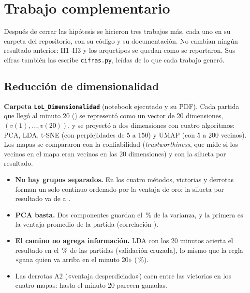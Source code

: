 \documentclass[11pt,letterpaper]{article}
\begin{document}
\section{Trabajo complementario}
\label{sec:complementario}

Después de cerrar las hipótesis se hicieron tres trabajos más, cada uno en su carpeta del
repositorio, con su código y su documentación. No cambian ningún resultado anterior: H1--H3
y los arquetipos se quedan como se reportaron. Sus cifras también las escribe
\texttt{cifras.py}, leídas de lo que cada trabajo generó.

\subsection{Reducción de dimensionalidad}
\textbf{Carpeta \texttt{LoL\_Dimensionalidad}} (notebook ejecutado y su PDF). Cada partida que
llegó al minuto 20 (\drN) se representó como un vector de 20 dimensiones,
\((v(1), \dots, v(20))\), y se proyectó a dos dimensiones con cuatro algoritmos: PCA, LDA,
t-SNE (con perplejidades de 5 a 150) y UMAP (con 5 a 200 vecinos). Los mapas se compararon
con la confiabilidad (\emph{trustworthiness}, que mide si los vecinos en el mapa eran vecinos
en las 20 dimensiones) y con la silueta por resultado.
\begin{itemize}[leftmargin=1.4em,itemsep=.2em]
  \item \textbf{No hay grupos separados.} En los cuatro métodos, victorias y derrotas forman
        un solo continuo ordenado por la ventaja de oro; la silueta por resultado va de
        \drSilMin{} a \drSilMax.
  \item \textbf{PCA basta.} Dos componentes guardan el \drPcaDos\,\% de la varianza, y la
        primera es la ventaja promedio de la partida (correlación \drPcUnoCorr).
  \item \textbf{El camino no agrega información.} LDA con los 20 minutos acierta el resultado
        en el \drLda\,\% de las partidas (validación cruzada), lo mismo que la regla «gana quien
        va arriba en el minuto 20» (\drVveinte\,\%).
  \item Las derrotas A2 («ventaja desperdiciada») caen entre las victorias en los cuatro
        mapas: hasta el minuto 20 parecen ganadas.
\end{itemize}
\end{document}
